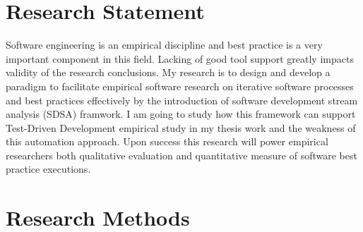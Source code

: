\section{Research Statement}
Software engineering is an empirical discipline and best practice is a very
important component in this field. Lacking of good tool support greatly
impacts validity of the research conclusions. My research is to design and
develop a paradigm to facilitate empirical software research on iterative
software processes and best practices effectively by the introduction of
software development stream analysis (SDSA) framwork. I am going to study
how this framework can support Test-Driven Development empirical study in
my thesis work and the weakness of this automation approach. Upon success
this research will power empirical researchers both qualitative evaluation
and quantitative measure of software best practice executions.

\section{Research Methods}


